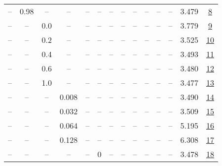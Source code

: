 \begin{table}[H]
\begin{tabular}{cccccccccccccc}
-- & 0.98 & -- & -- & -- & -- & -- & -- & -- & -- & -- & -- & 3.479 & \href{https://wandb.ai/stanford-mercury/optimizer-scaling/runs/sweep-130m-2B-scion298bd3lr0.016-wd0.1-minlr0-warmup0-b10.98-gn1-ca3133}{8} \\
-- & -- & 0.0 & -- & -- & -- & -- & -- & -- & -- & -- & -- & 3.779 & \href{https://wandb.ai/stanford-mercury/optimizer-scaling/runs/sweep-130m-2B-scione7f648lr0.016-wd0.1-minlr0-warmup0-b10.95-gn1-c67748}{9} \\
-- & -- & 0.2 & -- & -- & -- & -- & -- & -- & -- & -- & -- & 3.525 & \href{https://wandb.ai/stanford-mercury/optimizer-scaling/runs/sweep-130m-2B-scion1a724elr0.016-wd0.1-minlr0-warmup0-b10.95-gn1-32726f}{10} \\
-- & -- & 0.4 & -- & -- & -- & -- & -- & -- & -- & -- & -- & 3.493 & \href{https://wandb.ai/stanford-mercury/optimizer-scaling/runs/sweep-130m-2B-sciona3bd94lr0.016-wd0.1-minlr0-warmup0-b10.95-gn1-47edd4}{11} \\
-- & -- & 0.6 & -- & -- & -- & -- & -- & -- & -- & -- & -- & 3.480 & \href{https://wandb.ai/stanford-mercury/optimizer-scaling/runs/sweep-130m-2B-scion4f23ealr0.016-wd0.1-minlr0-warmup0-b10.95-gn1-ec1bf5}{12} \\
-- & -- & 1.0 & -- & -- & -- & -- & -- & -- & -- & -- & -- & 3.477 & \href{https://wandb.ai/stanford-mercury/optimizer-scaling/runs/sweep-130m-2B-sciond05cc9lr0.016-wd0.1-minlr0-warmup0-b10.95-gn1-e01433}{13} \\
-- & -- & -- & 0.008 & -- & -- & -- & -- & -- & -- & -- & -- & 3.490 & \href{https://wandb.ai/stanford-mercury/optimizer-scaling/runs/sweep-130m-2B-scion0c58eflr0.008-wd0.1-minlr0-warmup0-b10.95-gn1-649961}{14} \\
-- & -- & -- & 0.032 & -- & -- & -- & -- & -- & -- & -- & -- & 3.509 & \href{https://wandb.ai/stanford-mercury/optimizer-scaling/runs/sweep-130m-2B-scion96b754lr0.032-wd0.1-minlr0-warmup0-b10.95-gn1-c69eb3}{15} \\
-- & -- & -- & 0.064 & -- & -- & -- & -- & -- & -- & -- & -- & 5.195 & \href{https://wandb.ai/stanford-mercury/optimizer-scaling/runs/sweep-130m-2B-scion67b228lr0.064-wd0.1-minlr0-warmup0-b10.95-gn1-c13476}{16} \\
-- & -- & -- & 0.128 & -- & -- & -- & -- & -- & -- & -- & -- & 6.308 & \href{https://wandb.ai/stanford-mercury/optimizer-scaling/runs/sweep-130m-2B-scion8f1585lr0.128-wd0.1-minlr0-warmup0-b10.95-gn1-6644ed}{17} \\
-- & -- & -- & -- & -- & 0 & -- & -- & -- & -- & -- & -- & 3.478 & \href{https://wandb.ai/stanford-mercury/optimizer-scaling/runs/sweep-130m-2B-scion9c4dc9lr0.016-wd0.1-minlr0-warmup0-b10.95-gn0-5bdf0c}{18} \\

\end{tabular}
\end{table}
